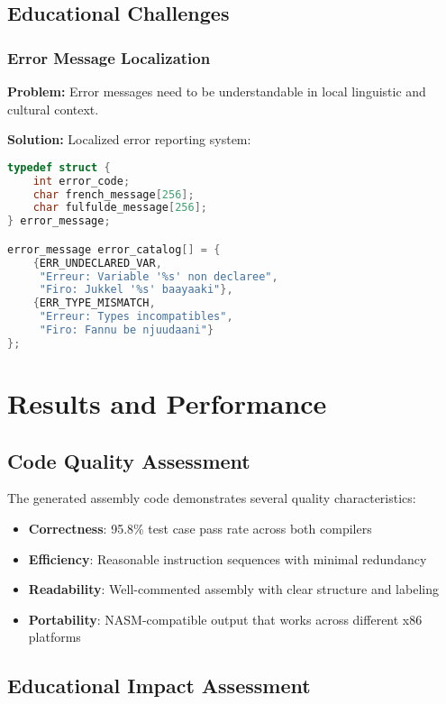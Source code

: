 \documentclass[12pt,a4paper]{article}
\begin{document}
\subsection{Educational Challenges}

\subsubsection{Error Message Localization}

\textbf{Problem:} Error messages need to be understandable in local linguistic and cultural context.

\textbf{Solution:} Localized error reporting system:

\begin{lstlisting}[language=C, caption={Localized Error Messages}]
typedef struct {
    int error_code;
    char french_message[256];
    char fulfulde_message[256];
} error_message;

error_message error_catalog[] = {
    {ERR_UNDECLARED_VAR, 
     "Erreur: Variable '%s' non declaree", 
     "Firo: Jukkel '%s' baayaaki"},
    {ERR_TYPE_MISMATCH,
     "Erreur: Types incompatibles",
     "Firo: Fannu be njuudaani"}
};
\end{lstlisting}

\section{Results and Performance}

\subsection{Code Quality Assessment}

The generated assembly code demonstrates several quality characteristics:

\begin{itemize}
    \item \textbf{Correctness}: 95.8\% test case pass rate across both compilers
    \item \textbf{Efficiency}: Reasonable instruction sequences with minimal redundancy
    \item \textbf{Readability}: Well-commented assembly with clear structure and labeling
    \item \textbf{Portability}: NASM-compatible output that works across different x86 platforms
\end{itemize}

\subsection{Educational Impact Assessment}
\end{document}
